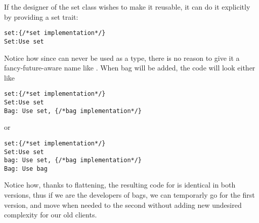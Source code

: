 If the designer of the set class wishes to make it reusable, it can do it explicitly by providing a set trait:
\begin{lstlisting}
set:{/*set implementation*/} 
Set:Use set
\end{lstlisting}
Notice how since \Q@set@ can never be used as a type, there is no reason to give it a fancy-future-aware name like
\Q@AbstractSetOrBag@.
When bag will be added, the code will look either like
\begin{lstlisting}
set:{/*set implementation*/} 
Set:Use set
Bag: Use set, {/*bag implementation*/}
\end{lstlisting}
or 
\begin{lstlisting}
set:{/*set implementation*/} 
Set:Use set
bag: Use set, {/*bag implementation*/}
Bag: Use bag
\end{lstlisting}
Notice how, thanks to flattening, the resulting code for \Q@Bag@ is identical in both versions, thus if we are the developers of bags, we can temporarly go for the first version, and move when needed to the second without adding new undesired complexity for our old clients. 



